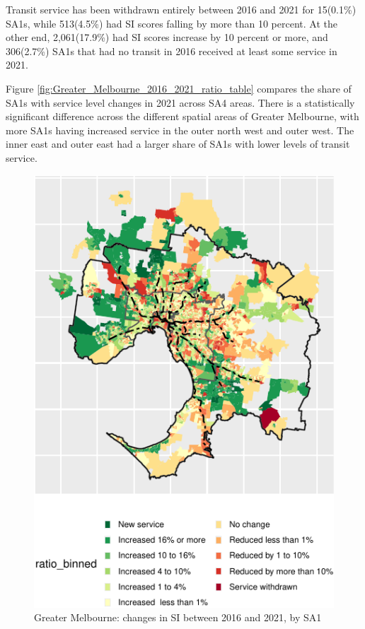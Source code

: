 \documentclass[preprint, 3p,
authoryear]{elsarticle} %
\begin{document}
Transit service has been withdrawn entirely between 2016 and 2021 for
15(0.1\%) SA1s, while 513(4.5\%) had SI scores falling by more than 10
percent. At the other end, 2,061(17.9\%) had SI scores increase by 10
percent or more, and 306(2.7\%) SA1s that had no transit in 2016
received at least some service in 2021.

Figure \ref{fig:Greater_Melbourne_2016_2021_ratio_table} compares the
share of SA1s with service level changes in 2021 across SA4 areas. There
is a statistically significant difference across the different spatial
areas of Greater Melbourne, with more SA1s having increased service in
the outer north west and outer west. The inner east and outer east had a
larger share of SA1s with lower levels of transit service.

\begin{figure}
\includegraphics[width=0.9\linewidth]{Leveraging_GTFS_to_assess_transit_supply_Transport_Geography_files/figure-latex/Greater_Melbourne_2016_2021_ratio_map-1} \caption{Greater Melbourne: changes in SI between 2016 and 2021, by SA1}\label{fig:Greater_Melbourne_2016_2021_ratio_map}
\end{figure}
\end{document}
